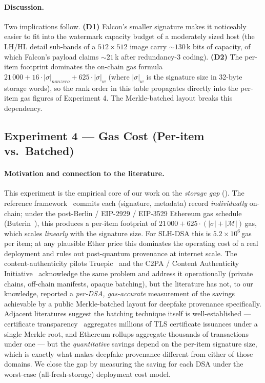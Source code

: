 \documentclass[11pt,a4paper]{article}
\theoremstyle{definition}
\theoremstyle{plain}
\theoremstyle{remark}
\begin{document}
\paragraph{Discussion.}
Two implications follow. \textbf{(D1)} Falcon's smaller signature
makes it noticeably easier to fit into the watermark capacity budget
of a moderately sized host (the LH/HL detail sub-bands of a
$512\!\times\!512$ image carry $\sim 130$\,k bits of capacity, of
which Falcon's payload claims $\sim 21$\,k after redundancy-3
coding). \textbf{(D2)} The per-item footprint dominates the on-chain
gas formula
$21\,000 + 16 \cdot |\sigma|_{\mathit{nonzero}} + 625 \cdot |\sigma|_w$
(where $|\sigma|_w$ is the signature size in 32-byte storage words),
so the rank order in this table propagates directly into the per-item
gas figures of Experiment 4. The Merkle-batched layout breaks this
dependency.

\subsection{Experiment 4 --- Gas Cost (Per-item vs.\ Batched)}\label{sec:exp4}

\paragraph{Motivation and connection to the literature.}
This experiment is the empirical core of our work on the
\emph{storage gap} (). The reference
framework~\cite{bib4} commits each (signature, metadata) record
\emph{individually} on-chain; under the post-Berlin / EIP-2929 /
EIP-3529 Ethereum gas schedule (Buterin~\cite{bib9}), this
produces a per-item footprint of
$21\,000 + 625 \cdot (|\sigma| + |\mathcal{M}|)$\,gas, which scales
\emph{linearly} with the signature size. For SLH-DSA this is
$5.2\!\times\!10^6$\,gas per item; at any plausible Ether price
this dominates the operating cost of a real deployment and rules
out post-quantum provenance at internet scale. The
content-authenticity pilots Truepic~\cite{bib14} and the C2PA /
Content Authenticity Initiative~\cite{bib13} acknowledge the same
problem and address it operationally (private chains, off-chain
manifests, opaque batching), but the literature has not, to our
knowledge, reported a \emph{per-DSA, gas-accurate} measurement of
the savings achievable by a public Merkle-batched layout for
deepfake provenance specifically. Adjacent literatures suggest the
batching technique itself is well-established --- certificate
transparency~\cite{bib9} aggregates millions of TLS certificate
issuances under a single Merkle root, and Ethereum rollups
aggregate thousands of transactions under one --- but the
\emph{quantitative} savings depend on the per-item signature size,
which is exactly what makes deepfake provenance different from
either of those domains. We close the gap by measuring the
saving for each DSA under the worst-case (all-fresh-storage)
deployment cost model.
\end{document}

